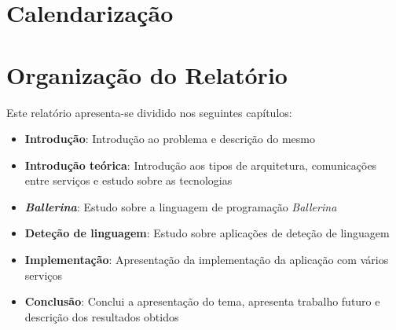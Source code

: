 \section{Calendarização}
\label{sec:Ch1.3}





\section{Organização do Relatório}
\label{sec:Ch1.4}


Este relatório apresenta-se dividido nos seguintes capítulos:

\begin{itemize}
    \item \textbf{Introdução}: Introdução ao problema e descrição do mesmo
    \item \textbf{Introdução teórica}: Introdução aos tipos de arquitetura, comunicações entre serviços e estudo sobre as tecnologias
    \item \textbf{\textit{Ballerina}}: Estudo sobre a linguagem de programação \textit{Ballerina}
    \item \textbf{Deteção de linguagem}: Estudo sobre aplicações de deteção de linguagem
    \item \textbf{Implementação}: Apresentação da implementação da aplicação com vários serviços
    \item \textbf{Conclusão}: Conclui a apresentação do tema, apresenta trabalho futuro e descrição dos resultados obtidos
\end{itemize}



